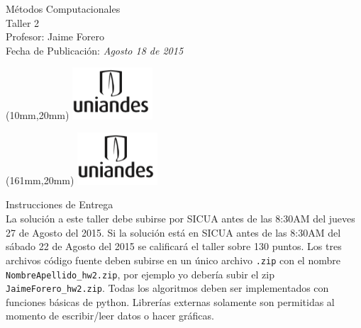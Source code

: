 \documentclass[11pt,letterpaper]{exam}
\begin{document}
\begin{center}
{\Large Métodos Computacionales} \\
Taller 2 \\
Profesor: Jaime Forero\\
Fecha de Publicación: {\small \it Agosto 18 de 2015}\\
\end{center}

\begin{textblock*}{40mm}(10mm,20mm)
  \includegraphics[width=3cm]{logoUniandes.png}
\end{textblock*}

\begin{textblock*}{40mm}(161mm,20mm)
  \includegraphics[width=3cm]{logoUniandes.png}
\end{textblock*}

\vspace{0.5cm}

{\Large Instrucciones de Entrega}\\

\noindent
La solución a este taller debe subirse por SICUA antes de las 8:30AM
del jueves 27 de Agosto del 2015. 
\noindent
Si la soluci\'on est\'a en SICUA
antes de las 8:30AM del s\'abado 22 de Agosto del 2015 se calificar\'a
el taller sobre 130 puntos. 
\noindent
Los tres archivos c\'odigo fuente deben subirse en un \'unico archivo
\verb".zip" con el nombre \verb"NombreApellido_hw2.zip", por ejemplo
yo deber\'ia subir el zip \verb"JaimeForero_hw2.zip".
\noindent
Todas los algoritmos deben ser implementados con funciones b\'asicas
de python. Librer\'ias externas solamente son permitidas al momento de
escribir/leer datos o hacer gr\'aficas.
\end{document}
